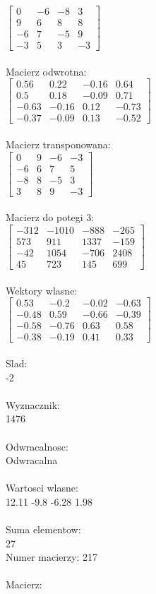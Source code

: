 \documentclass[a4paper,12pt]{article}
\begin{document}
$\begin{bmatrix} 0&-6&-8&3\\9&6&8&8\\-6&7&-5&9\\-3&5&3&-3 \end{bmatrix}$
\\
\\
Macierz odwrotna:\\

$\begin{bmatrix} 0.56&0.22&-0.16&0.64\\0.5&0.18&-0.09&0.71\\-0.63&-0.16&0.12&-0.73\\-0.37&-0.09&0.13&-0.52 \end{bmatrix}$
\\
\\
Macierz transponowana:\\

$\begin{bmatrix} 0&9&-6&-3\\-6&6&7&5\\-8&8&-5&3\\3&8&9&-3 \end{bmatrix}$
\\
\\
Macierz do potegi 3:\\

$\begin{bmatrix} -312&-1010&-888&-265\\573&911&1337&-159\\-42&1054&-706&2408\\45&723&145&699 \end{bmatrix}$
\\
\\
Wektory wlasne:\\

$\begin{bmatrix} 0.53&-0.2&-0.02&-0.63\\-0.48&0.59&-0.66&-0.39\\-0.58&-0.76&0.63&0.58\\-0.38&-0.19&0.41&0.33 \end{bmatrix}$
\\
\\
Slad:\\
-2
\\
\\
Wyznacznik:\\
1476
\\
\\
Odwracalnosc:\\
Odwracalna
\\
\\
Wartosci wlasne:\\
12.11 -9.8 -6.28 1.98
\\
\\
Suma elementow:\\
27
\\
\newpage
Numer macierzy:
217
\\
\\
Macierz:\\
\end{document}
